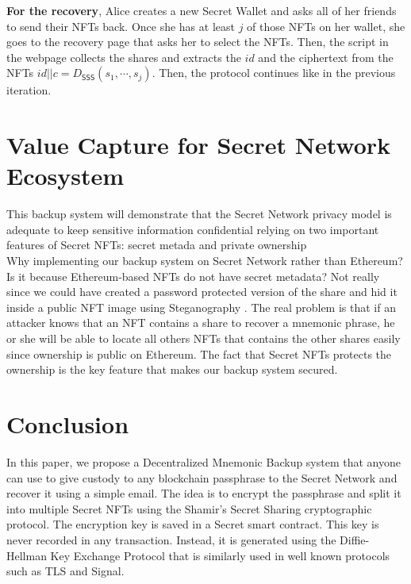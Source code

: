 \documentclass[12pt]{article}
\newcommand{\ms}[1]{\ensuremath{\mathsf{#1}}}
\begin{document}
{\bf For the recovery}, Alice creates a new Secret Wallet and asks all of her friends to send their NFTs back. Once she has at least $j$ of those NFTs on her wallet, she goes to the recovery page that asks her to select the NFTs. Then, the script in the webpage collects the shares and extracts the $id$ and the ciphertext from the NFTs $id||c = D_{\ms{SSS}}(s_1,\cdots,s_j)$. Then, the protocol continues like in the previous iteration. 

\section{Value Capture for Secret Network Ecosystem}

This backup system will demonstrate that the Secret Network privacy model is adequate to keep sensitive information confidential relying on two important features of Secret NFTs: secret metada and private ownership \\ 

Why implementing our backup system on Secret Network rather than Ethereum? Is it because Ethereum-based NFTs do not have secret metadata? Not really since we could have created a password protected version of the share and hid it inside a public NFT image using Steganography \cite{Steganography}. The real problem is that if an attacker knows that an NFT contains a share to recover a mnemonic phrase, he or she will be able to locate all others NFTs that contains the other shares easily since ownership is public on Ethereum. The fact that Secret NFTs protects the ownership is the key feature that makes our backup system secured. 

\section{Conclusion}

In this paper, we propose a Decentralized Mnemonic Backup system that anyone can use to give custody to any blockchain passphrase to the Secret Network \cite{SecretNetwork} and recover it using a simple email. The idea is to encrypt the passphrase and split it into multiple Secret NFTs using the Shamir's Secret Sharing cryptographic protocol. The encryption key is saved in a Secret smart contract. This key is never recorded in any transaction. Instead, it is generated using the Diffie-Hellman Key Exchange Protocol that is similarly used in well known protocols such as TLS and Signal. \\
\end{document}
